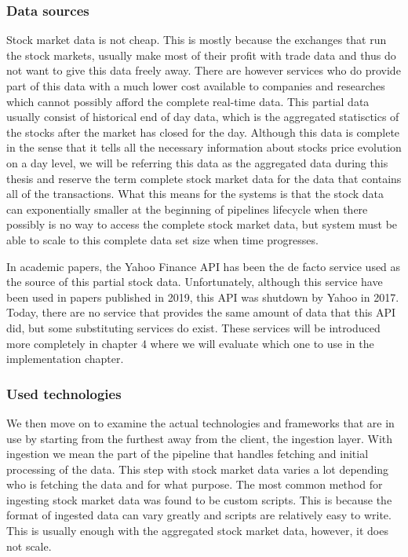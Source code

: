 \subsubsection{Data sources}

Stock market data is not cheap.
This is mostly because the exchanges that run the stock markets, usually make most of their profit with trade data and thus do not want to give this data freely away.
There are however services who do provide part of this data with a much lower cost available to companies and researches which cannot possibly afford the complete real-time data.
This partial data usually consist of historical end of day data, which is the aggregated statisctics of the stocks after the market has closed for the day.
Although this data is complete in the sense that it tells all the necessary information about stocks price evolution on a day level, we will be referring this data as the aggregated data during this thesis and reserve the term complete stock market data for the data that contains all of the transactions.
What this means for the systems is that the stock data can exponentially smaller at the beginning of pipelines lifecycle when there possibly is no way to access the complete stock market data, but system must be able to scale to this complete data set size when time progresses.

In academic papers, the Yahoo Finance API has been the de facto service used as the source of this partial stock data. \cite{islam} \cite{adresic} \cite{le} \cite{serez}
Unfortunately, although this service have been used in papers published in 2019, this API was shutdown by Yahoo in 2017.
Today, there are no service that provides the same amount of data that this API did, but some substituting services do exist.\cite{lotter}
These services will be introduced more completely in chapter 4 where we will evaluate which one to use in the implementation chapter.

\subsubsection{Used technologies}

We then move on to examine the actual technologies and frameworks that are in use by starting from the furthest away from the client, the ingestion layer.
With ingestion we mean the part of the pipeline that handles fetching and initial processing of the data.
This step with stock market data varies a lot depending who is fetching the data and for what purpose.
The most common method for ingesting stock market data was found to be custom scripts.
This is because the format of ingested data can vary greatly and scripts are relatively easy to write.
This is usually enough with the aggregated stock market data, however, it does not scale.


